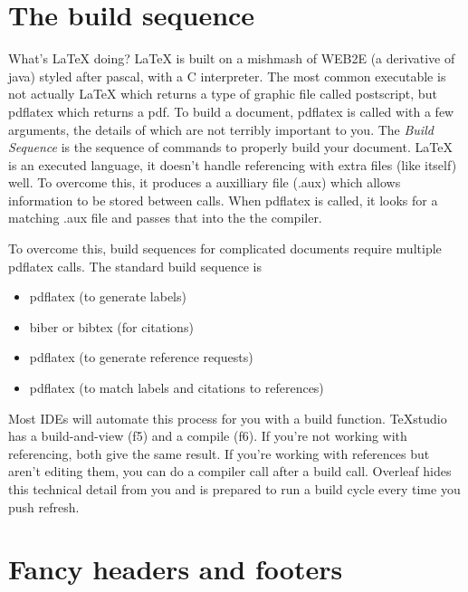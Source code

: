\documentclass[11pt]{article}
\begin{document}
\section{The build sequence}
What's \LaTeX{} doing? \LaTeX{} is built on a mishmash of WEB2E (a derivative of java) styled after pascal, with a C interpreter. The most common executable is not actually LaTeX which returns a type of graphic file called postscript, but pdflatex which returns a pdf. To build a document, pdflatex is called with a few arguments, the details of which are not terribly important to you. The \emph{Build Sequence} is the sequence of commands to properly build your document. LaTeX is an executed language, it doesn't handle referencing with extra files (like itself) well. To overcome this, it produces a auxilliary file (.aux) which allows information to be stored between calls. When pdflatex is called, it looks for a matching .aux file and passes that into the the compiler.  

To overcome this, build sequences for complicated documents require multiple pdflatex calls. The standard build sequence is
\begin{itemize}
	\item pdflatex (to generate labels)
	\item biber or bibtex (for citations)
	\item pdflatex (to generate reference requests)
	\item pdflatex (to match labels and citations to references)
\end{itemize} 
Most IDEs will automate this process for you with a build function. TeXstudio has a build-and-view (f5) and a compile (f6). If you're not working with referencing, both give the same result. If you're working with references but aren't editing them, you can do a compiler call after a build call. Overleaf hides this technical detail from you and is prepared to run a build cycle every time you push refresh.

\section{Fancy headers and footers}
\end{document}
